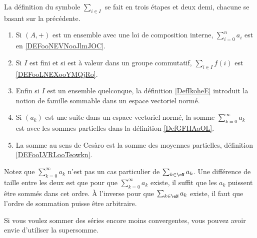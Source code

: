           \label{THEMEooMKLBooLGFCdx}
La définition du symbole \( \sum_{i\in I}\) se fait en trois étapes et deux demi, chacune se basant sur la précédente.
\begin{enumerate}
    \item
        Si \( (A,+)\) est un ensemble avec une loi de composition interne, \( \sum_{i=0}^na_i\) est en \ref{DEFooNEVNooJlmJOC}.
    \item
        Si \( I\) est fini et si est à valeur dans un groupe commutatif, \( \sum_{i\in I}f(i)\) est \ref{DEFooLNEXooYMQjRo}.
    \item 
        Enfin si \( I\) est un ensemble quelconque, la définition \ref{DefIkoheE} introduit la notion de famille sommable dans un espace vectoriel normé.
    \item
        Si \( (a_k)\) est une suite dans un espace vectoriel normé, la somme \( \sum_{k=0}^{\infty}a_k\) est avec les sommes partielles dans la définition \ref{DefGFHAaOL}.
    \item
        La somme au sens de Cesàro est la somme des moyennes partielles, définition \ref{DEFooLVRLooTeowkn}.
\end{enumerate}
Notez que \( \sum_{k=0}^{\infty}a_k\) n'est pas un cas particulier de \( \sum_{k\in \eN}a_k\). Une différence de taille entre les deux est que pour que \( \sum_{k=0}^{\infty}a_k\) existe, il suffit que les \( a_k\) puissent être sommés dans cet ordre. À l'inverse pour que \( \sum_{k\in \eN}a_k\) existe, il faut que l'ordre de sommation puisse être arbitraire. 

Si vous voulez sommer des séries encore moins convergentes, vous pouvez avoir envie d'utiliser la supersomme\cite{BIBooUCSPooNKNWEK}.


